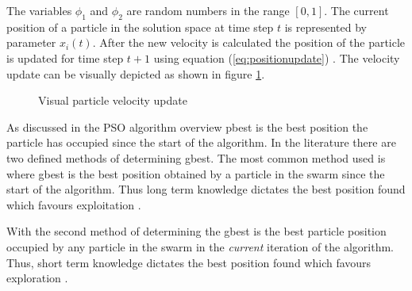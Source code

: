The variables $\phi_1$ and $\phi_2$ are random numbers in the range $[0,1]$. The current position of a particle in the solution space at time step $t$ is represented by parameter $x_i(t)$\cite{FundamentalSwarm,CompuIntelligenceIntro}. After the new velocity is calculated the position of the particle is updated for time step $t+1$ using equation (\ref{eq:positionupdate}) \cite{FundamentalSwarm,CompuIntelligenceIntro}. The velocity update can be visually depicted as shown in figure \ref{fig:particleVelocityUpdate}. 
\begin{figure}[h]
	\begin{center}
	\caption{Visual particle velocity update \cite{SOSwarm,FundamentalSwarm,CompuIntelligenceIntro,PSOSelfHierarch}}

	\label{fig:particleVelocityUpdate}
	\end{center}
\end{figure}

As discussed in the PSO algorithm overview pbest is the best position the particle has occupied since the start of the algorithm. In the literature there are two defined methods of determining gbest. The most common method used is where gbest is the best position obtained by a particle in the swarm since the start of the algorithm. Thus long term knowledge dictates the best position found which favours exploitation \cite{CompuIntelligenceIntro,FundamentalSwarm}.

With the second method of determining the gbest is the best particle position occupied by any particle in the swarm in the \emph{current} iteration of the algorithm. Thus, short term knowledge dictates the best position found which favours exploration \cite{CompuIntelligenceIntro,FundamentalSwarm}.

